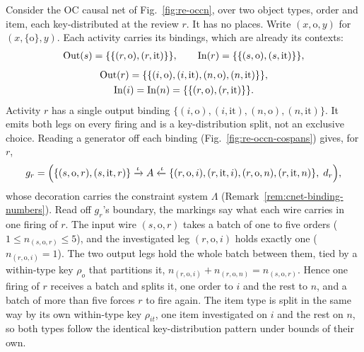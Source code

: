 \begin{exmp}
  \label{ex:running-cnet-cospan}
  Consider the OC causal net of Fig.~\ref{fig:re-occn}, over two object types,
  $\mathrm{order}$ and $\mathrm{item}$, each key-distributed at the review $r$. It has no places. Write $(x,\mathrm{o},y)$ for $(x,\{\mathrm{o}\},y)$. Each
  activity carries its bindings, which are already its contexts:
  \begin{gather*}
    \mathrm{Out}(s)=\{\{(r,\mathrm{o}),(r,\mathrm{it})\}\},\qquad
    \mathrm{In}(r)=\{\{(s,\mathrm{o}),(s,\mathrm{it})\}\},
  \end{gather*}
  \begin{gather*}
    \mathrm{Out}(r)=\{\{(i,\mathrm{o}),(i,\mathrm{it}),(n,\mathrm{o}),(n,\mathrm{it})\}\},\\
    \mathrm{In}(i)=\mathrm{In}(n)=\{\{(r,\mathrm{o}),(r,\mathrm{it})\}\}.
  \end{gather*}
  Activity $r$ has a single output binding $\{(i,\mathrm{o}),(i,\mathrm{it}),(n,\mathrm{o}),(n,\mathrm{it})\}$. It
  emits both legs on every firing and is a key-distribution split, not an
  exclusive choice. Reading a generator off each binding
  (Fig.~\ref{fig:re-occn-cospans}) gives, for $r$,
  \begin{gather*}
    g_r = \Bigl(\{(s,\mathrm{o},r),(s,\mathrm{it},r)\}
      \xrightarrow{\iota} A \xleftarrow{\iota} 
      \{(r,\mathrm{o},i),(r,\mathrm{it},i),(r,\mathrm{o},n),(r,\mathrm{it},n)\},\; d_r\Bigr),
  \end{gather*}
  whose decoration carries the constraint system $\Lambda$
  (Remark~\ref{rem:cnet-binding-numbers}). Read off $g_r$'s boundary, the markings say what each
  wire carries in one firing of $r$. The input wire $(s,\mathrm{o},r)$ takes a batch of one to
  five orders ($1\le n_{(s,\mathrm{o},r)}\le 5$), and the investigated leg $(r,\mathrm{o},i)$
  holds exactly one ($n_{(r,\mathrm{o},i)}=1$). The two output legs hold the whole batch between
  them, tied by a within-type key $\rho_{o}$ that partitions it,
  $n_{(r,\mathrm{o},i)}+n_{(r,\mathrm{o},n)}=n_{(s,\mathrm{o},r)}$. Hence one firing of $r$
  receives a batch and splits it, one order to $i$ and the rest to $n$, and a batch of more than five
  forces $r$ to fire again. The item type is split in the same way by its own within-type key $\rho_{it}$, one item
  investigated on $i$ and the rest on $n$, so both types follow the identical key-distribution
  pattern under bounds of their own.
\end{exmp}

